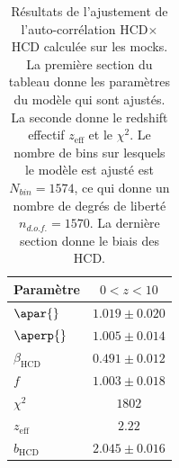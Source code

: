 \begin{table}[h]
  \centering
  \caption{Résultats de l'ajustement de l'auto-corrélation HCD$\times$HCD calculée sur les mocks. La première section du tableau donne les paramètres du modèle qui sont ajustés. La seconde donne le redshift effectif $z_{\mathrm{eff}}$ et le $\chi^2$. Le nombre de bins sur lesquels le modèle est ajusté est $N_{bin} = \num{1574}$, ce qui donne un nombre de degrés de liberté $n_{d.o.f.} = \num{1570}$. La dernière section donne le biais des HCD.}
  \label{tab:auto_hcd}
  \begin{tabular}{lc}
    \toprule
    Param\`etre  & $\num{0} < z < \num{10}$ \\
    \midrule
    $\apar{} $ & $ 1.019 \pm 0.020$ \\
    $\aperp{} $ & $ 1.005 \pm 0.014$ \\
    $\beta_{\mathrm{HCD}} $ & $ 0.491 \pm 0.012$ \\
    $f$ & $ 1.003 \pm 0.018$ \\
    \midrule
    $\chi^2$ & $ 1802 $ \\
    $z_{\mathrm{eff}}$ & $ 2.22 $ \\
    \midrule
    $b_{\mathrm{HCD}} $ & $ 2.045 \pm 0.016$ \\
\bottomrule
  \end{tabular}
\end{table}

\newpage
